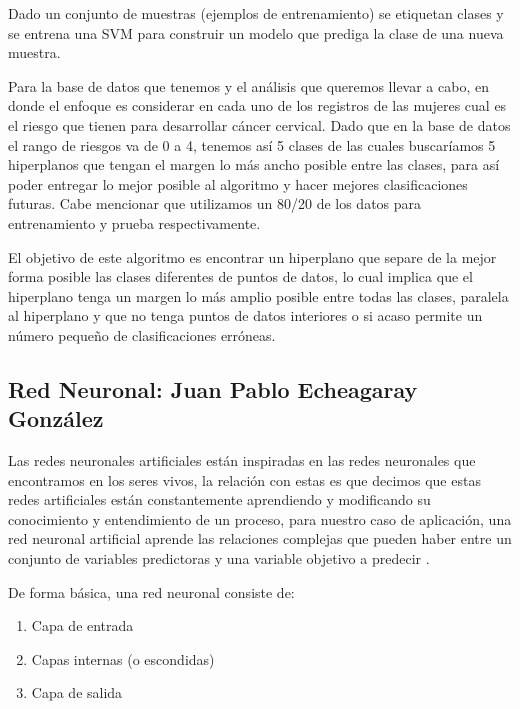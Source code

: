 \documentclass[journal]{IEEEtran}                                                          %
\begin{document}
            Dado un conjunto de muestras (ejemplos de entrenamiento) se etiquetan clases y se entrena una SVM para construir un modelo que prediga la clase de una nueva muestra.

            Para la base de datos que tenemos y el análisis que queremos llevar a cabo, en donde el enfoque es considerar en cada uno de los registros de las mujeres cual es el riesgo que tienen para desarrollar cáncer cervical. Dado que en la base de datos el rango de riesgos va de 0 a 4, tenemos así 5 clases de las cuales buscaríamos 5 hiperplanos que tengan el margen lo más ancho posible entre las clases, para así poder entregar lo mejor posible al algoritmo y hacer mejores clasificaciones futuras. Cabe mencionar que utilizamos un 80/20 de los datos para entrenamiento y prueba respectivamente.

            El objetivo de este algoritmo es encontrar un hiperplano que separe de la mejor forma posible las clases diferentes de puntos de datos, lo cual implica que el hiperplano tenga un margen lo más amplio posible entre todas las clases, paralela al hiperplano y que no tenga puntos de datos interiores o si acaso permite un número pequeño de clasificaciones erróneas.

        \subsection{Red Neuronal: Juan Pablo Echeagaray González} \label{neural-network}
           
            Las redes neuronales artificiales están inspiradas en las redes neuronales que encontramos en los seres vivos, la relación con estas es que decimos que estas redes artificiales están constantemente aprendiendo y modificando su conocimiento y entendimiento de un proceso, para nuestro caso de aplicación, una red neuronal artificial aprende las relaciones complejas que pueden haber entre un conjunto de variables predictoras y una variable objetivo a predecir \cite{geron-2019}.

            De forma básica, una red neuronal consiste de:
            \begin{enumerate}
                \item Capa de entrada
                \item Capas internas (o escondidas)
                \item Capa de salida
            \end{enumerate}
\end{document}
